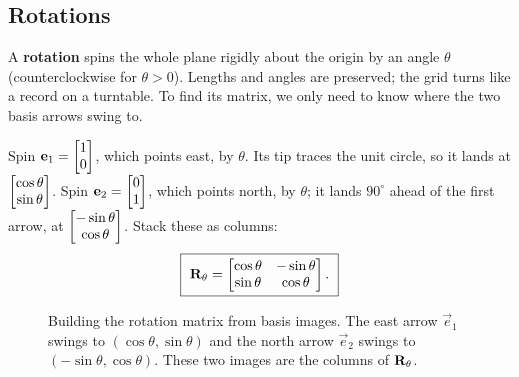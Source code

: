 \subsection{Rotations}
\label{ch05:rotations}

A \textbf{rotation} spins the whole plane rigidly about the origin by an angle
$\theta$ (counterclockwise for $\theta > 0$). Lengths and angles are preserved;
the grid turns like a record on a turntable. To find its matrix, we only need to
know where the two basis arrows swing to.

Spin $\mathbf{e}_1 = \begin{bmatrix}1\\0\end{bmatrix}$, which points east, by $\theta$. Its tip traces
the unit circle, so it lands at $\begin{bmatrix}\cos\theta\\\sin\theta\end{bmatrix}$. Spin
$\mathbf{e}_2 = \begin{bmatrix}0\\1\end{bmatrix}$, which points north, by $\theta$; it lands $90^\circ$
ahead of the first arrow, at $\begin{bmatrix}-\sin\theta\\\cos\theta\end{bmatrix}$. Stack these as
columns:
\[
  \boxed{\ \mathbf{R}_\theta
  = \begin{bmatrix} \cos\theta & -\sin\theta \\ \sin\theta & \cos\theta \end{bmatrix}.\ }
\]

\begin{figure}[H]
\centering
{}
\caption{Building the rotation matrix from basis images. The east arrow
$\vec{e}_1$ swings to $(\cos\theta,\sin\theta)$ and the north arrow $\vec{e}_2$
swings to $(-\sin\theta,\cos\theta)$. These two images are the columns of
$\mathbf{R}_\theta$.}
\label{ch05:fig-rotation}
\end{figure}

